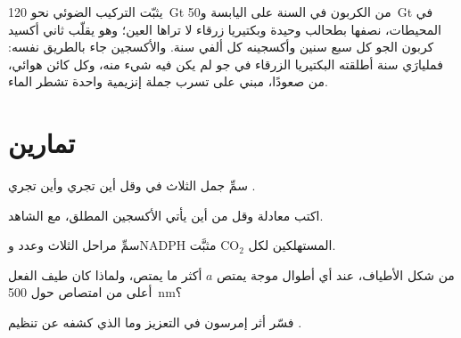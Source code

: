 \begin{example}\label{ex:b1:photosynthesis:global}
يثبّت التركيب الضوئي نحو \qty{120}{Gt} من الكربون في السنة على
اليابسة و\qty{50}{Gt} في المحيطات، نصفها بطحالب وحيدة 
وبكتيريا زرقاء لا تراها العين؛ وهو يقلّب ثاني أكسيد كربون الجو كل
سبع سنين وأكسجينه كل ألفي سنة. والأكسجين جاء بالطريق نفسه: فمليارَي
سنة أطلقته البكتيريا الزرقاء في جو لم يكن فيه شيء منه، وكل كائن
هوائي، من  صعودًا، مبني على تسرب جملة إنزيمية واحدة تشطر
الماء.
\end{example}

\section{تمارين}

\begin{exercise}[$\star$]\label{exo:b1:photosynthesis:1}
سمِّ جمل  الثلاث في  وقل أين تجري  وأين تجري .
\end{exercise}

\begin{exercise}[$\star$]\label{exo:b1:photosynthesis:2}
اكتب معادلة  وقل من أين يأتي الأكسجين المطلق، مع
الشاهد.
\end{exercise}

\begin{exercise}[$\star$]\label{exo:b1:photosynthesis:3}
سمِّ مراحل  الثلاث وعدد  وNADPH المستهلكين لكل
$\mathrm{CO_2}$ مثبَّت.
\end{exercise}

\begin{exercise}[$\star$]\label{exo:b1:photosynthesis:4}
من شكل الأطياف، عند أي أطوال موجة يمتص  $a$ أكثر ما يمتص،
ولماذا كان طيف الفعل أعلى من امتصاص  حول \qty{500}{nm}؟
\end{exercise}

\begin{exercise}[$\star\star$]\label{exo:b1:photosynthesis:5}
فسّر أثر إمرسون في التعزيز وما الذي كشفه عن تنظيم .
\end{exercise}

